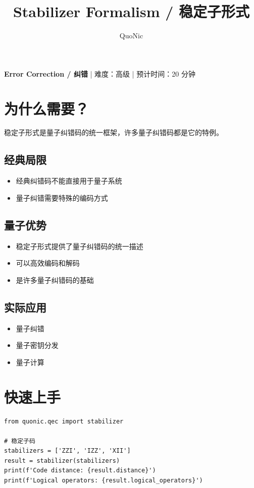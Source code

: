 \documentclass[12pt,a4paper]{article}
\title{Stabilizer Formalism / 稳定子形式}
\author{QuoNic}
\date{}
\begin{document}
\maketitle

\begin{center}
\textbf{Error Correction / 纠错} | 难度：高级 | 预计时间：20 分钟
\end{center}

\tableofcontents
\newpage

\section{为什么需要？}

稳定子形式是量子纠错码的统一框架，许多量子纠错码都是它的特例。

\subsection{经典局限}
\begin{itemize}
  \item 经典纠错码不能直接用于量子系统
  \item 量子纠错需要特殊的编码方式
\end{itemize}

\subsection{量子优势}
\begin{itemize}
  \item 稳定子形式提供了量子纠错码的统一描述
  \item 可以高效编码和解码
  \item 是许多量子纠错码的基础
\end{itemize}

\subsection{实际应用}
\begin{itemize}
  \item 量子纠错
  \item 量子密钥分发
  \item 量子计算
\end{itemize}

\section{快速上手}

\begin{verbatim}
from quonic.qec import stabilizer

# 稳定子码
stabilizers = ['ZZI', 'IZZ', 'XII']
result = stabilizer(stabilizers)
print(f'Code distance: {result.distance}')
print(f'Logical operators: {result.logical_operators}')
\end{verbatim}
\end{document}
